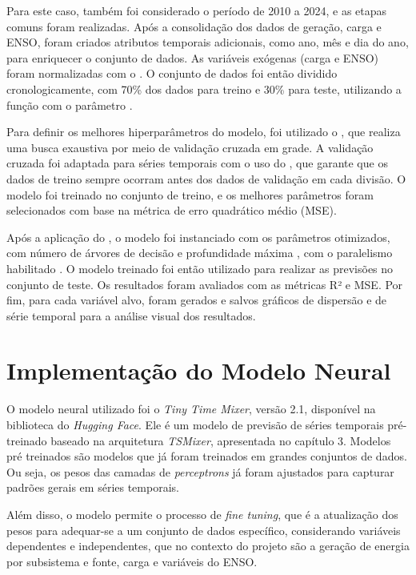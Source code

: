 Para este caso, também foi considerado o período de 2010 a 2024, e as etapas comuns foram realizadas. Após a consolidação 
dos dados de geração, carga e ENSO, foram criados atributos temporais adicionais, como ano, mês e dia do ano, para enriquecer 
o conjunto de dados. As variáveis exógenas (carga e ENSO) foram normalizadas com o . O conjunto de dados 
foi então dividido cronologicamente, com 70\% dos dados para treino e 30\% para teste, utilizando a função  
com o parâmetro .

Para definir os melhores hiperparâmetros do modelo, foi utilizado o , que realiza uma busca exaustiva por 
meio de validação cruzada em grade. A validação cruzada foi adaptada para séries temporais com o uso do , 
que garante que os dados de treino sempre ocorram antes dos dados de validação em cada divisão. O modelo foi treinado no conjunto 
de treino, e os melhores parâmetros foram selecionados com base na métrica de erro quadrático médio (MSE).

Após a aplicação do , o modelo foi instanciado com os parâmetros otimizados, com número de árvores de decisão 
 e profundidade máxima , com o paralelismo habilitado . O modelo 
treinado foi então utilizado para realizar as previsões no conjunto de teste. Os resultados foram avaliados com as métricas R² e MSE. 
Por fim, para cada variável alvo, foram gerados e salvos gráficos de dispersão e de série temporal para a análise visual dos resultados.


\section{Implementação do Modelo Neural} %
O modelo neural utilizado foi o \textit{Tiny Time Mixer}, versão 2.1, disponível na biblioteca  do 
\textit{Hugging Face}. Ele é um modelo de previsão de séries temporais pré-treinado baseado na arquitetura \textit{TSMixer}, 
apresentada no capítulo 3. Modelos pré treinados são modelos que já foram treinados em grandes conjuntos de dados. Ou seja, 
os pesos das camadas de \textit{perceptrons} já foram ajustados para capturar padrões gerais em séries temporais.

Além disso, o modelo permite o processo de \textit{fine tuning}, que é a atualização dos pesos para adequar-se
a um conjunto de dados específico, considerando variáveis dependentes e independentes, que no contexto do projeto são a geração de energia
por subsistema e fonte, carga e variáveis do ENSO.


